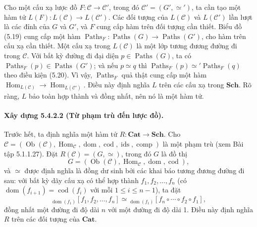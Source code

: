 Cho một cấu xạ lược đồ $F:\mathcal C\to\mathcal C'$, trong đó $\mathcal C'=(G',\simeq')$, ta cần tạo một hàm tử $L(F):L(\mathcal C)\to L(\mathcal C')$. Các đối tượng của $L(\mathcal C)$ và $L(\mathcal C')$ lần lượt là các đỉnh của $G$ và $G'$, và $F$ cung cấp hàm trên đối tượng cần thiết. Biểu đồ (5.19) cung cấp một hàm $\operatorname{Paths}_F:\operatorname{Paths}(G)\to\operatorname{Paths}(G')$, cho hàm trên cấu xạ cần thiết. Một cấu xạ trong $L(\mathcal C)$ là một lớp tương đương đường đi trong $\mathcal C$. Với bất kỳ đường đi đại diện $p\in\operatorname{Paths}(G)$, ta có $\operatorname{Paths}_F(p)\in\operatorname{Paths}(G')$; và nếu $p\simeq q$ thì $\operatorname{Paths}_F(p)\simeq'\operatorname{Paths}_F(q)$ theo điều kiện (5.20). Vì vậy, $\operatorname{Paths}_F$ quả thật cung cấp một hàm $\operatorname{Hom}_{L(\mathcal C)}\to\operatorname{Hom}_{L(\mathcal C')}$. Điều này định nghĩa $L$ trên các cấu xạ trong $\mathbf{Sch}$. Rõ ràng, $L$ bảo toàn hợp thành và đồng nhất, nên nó là một hàm tử.
\paragraph{Xây dựng 5.4.2.2 (Từ phạm trù đến lược đồ).} Trước hết, ta định nghĩa một hàm tử $R:\mathbf{Cat}\to\mathbf{Sch}$. Cho $\mathcal C=(\operatorname{Ob}(\mathcal C),\operatorname{Hom}_{\mathcal C},\operatorname{dom},\operatorname{cod},\operatorname{ids},\operatorname{comp})$ là một phạm trù (xem Bài tập 5.1.1.27). Đặt $R(\mathcal C)=(G,\simeq)$, trong đó $G$ là đồ thị
\[G=(\operatorname{Ob}(\mathcal C),\operatorname{Hom}_{\mathcal C},\operatorname{dom},\operatorname{cod}),\]
và $\simeq$ được định nghĩa là đồng dư sinh bởi các khai báo tương đương đường đi sau: với bất kỳ dãy cấu xạ có thể hợp thành $f_1,f_2,\ldots,f_n$ (có $\operatorname{dom}(f_{i+1})=\operatorname{cod}(f_i)$ với mỗi $1\leq i\leq n-1$), ta đặt
\begin{equation*}{}_{\operatorname{dom}(f_1)}[f_1,f_2,\ldots,f_n]\simeq{}_{\operatorname{dom}(f_1)}[f_n\circ\cdots\circ f_2\circ f_1],\tag{5.22}\end{equation*}
đồng nhất một đường đi độ dài $n$ với một đường đi độ dài 1. Điều này định nghĩa $R$ trên các đối tượng của $\mathbf{Cat}$.

